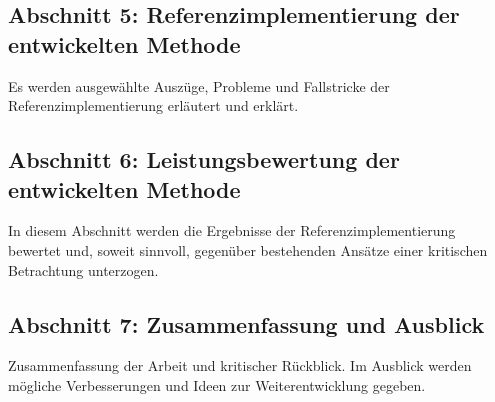 		\subsection*{Abschnitt 5: Referenzimplementierung der entwickelten Methode}
			Es werden ausgewählte Auszüge, Probleme und Fallstricke der Referenzimplementierung erläutert und erklärt. 

		\subsection*{Abschnitt 6: Leistungsbewertung der entwickelten Methode}
			In diesem Abschnitt werden die Ergebnisse der Referenzimplementierung bewertet und, soweit sinnvoll, gegenüber bestehenden Ansätze einer kritischen Betrachtung unterzogen. 

		\subsection*{Abschnitt 7: Zusammenfassung und Ausblick}
			Zusammenfassung der Arbeit und kritischer Rückblick. Im Ausblick werden mögliche Verbesserungen und Ideen zur Weiterentwicklung gegeben.  